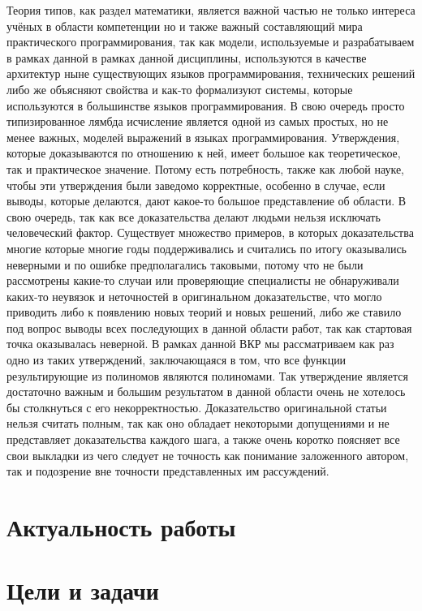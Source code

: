 \documentclass[times,specification,annotation]{itmo-student-thesis}
\begin{document}
\startprefacepage
Теория типов, как раздел математики, является важной частью не только интереса учёных в области компетенции но и также важный составляющий мира практического программирования, так как модели, используемые и разрабатываем в рамках данной в рамках данной дисциплины, используются в качестве архитектур ныне существующих языков программирования, технических решений либо же объясняют свойства и как-то формализуют системы, которые используются в большинстве языков программирования. В свою очередь просто типизированное лямбда исчисление является одной из самых простых, но не менее важных, моделей выражений в языках программирования. Утверждения, которые доказываются по отношению к ней, имеет большое как теоретическое, так и практическое значение. Потому есть потребность, также как любой науке, чтобы эти утверждения были заведомо корректные, особенно в случае, если выводы, которые делаются, дают какое-то большое представление об области. В свою очередь, так как все доказательства делают людьми нельзя исключать человеческий фактор. Существует множество примеров, в которых доказательства многие которые многие годы поддерживались и считались по итогу оказывались неверными и по ошибке предполагались таковыми, потому что не были рассмотрены какие-то случаи или проверяющие специалисты не обнаруживали каких-то неувязок и неточностей в оригинальном доказательстве, что могло приводить либо к появлению новых теорий и новых решений, либо же ставило под вопрос выводы всех последующих в данной области работ, так как стартовая точка оказывалась неверной. В рамках данной ВКР мы рассматриваем как раз одно из таких утверждений, заключающаяся в том, что все функции результирующие из полиномов являются полиномами. Так утверждение является достаточно важным и большим результатом в данной области очень не хотелось бы столкнуться с его некорректностью.  Доказательство оригинальной статьи нельзя считать полным, так как оно обладает некоторыми допущениями и не представляет доказательства каждого шага, а также очень коротко поясняет все свои выкладки из чего следует не точность как понимание  заложенного автором, так и подозрение вне точности представленных им рассуждений.



\section{Актуальность работы}
\todo
\section{Цели и задачи}
\todo
\end{document}
